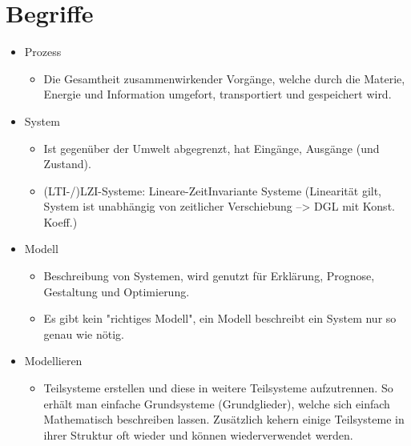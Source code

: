 \documentclass[margin=normal]{tex/hsrzf}
\begin{document}
\section{Begriffe}
\begin{itemize}
      \item Prozess
            \begin{itemize}
                  \item Die Gesamtheit zusammenwirkender Vorgänge, welche durch
                        die Materie, Energie und Information
                        umgefort, transportiert und gespeichert wird.
            \end{itemize}

      \item System
            \begin{itemize}
                  \item Ist gegenüber der Umwelt abgegrenzt, hat Eingänge,
                        Ausgänge (und Zustand).
                  \item (LTI-/)LZI-Systeme: Lineare-ZeitInvariante Systeme
                        (Linearität gilt, System ist unabhängig von zeitlicher Verschiebung
                        --> DGL mit Konst. Koeff.)
            \end{itemize}

      \item Modell
            \begin{itemize}
                  \item Beschreibung von Systemen, wird genutzt für
                        Erklärung, Prognose, Gestaltung und Optimierung.
                  \item Es gibt kein "richtiges Modell",
                        ein Modell beschreibt ein System nur so genau wie nötig.
            \end{itemize}
      \item Modellieren
            \begin{itemize}
                  \item Teilsysteme erstellen und diese
                        in weitere Teilsysteme aufzutrennen.
                        So erhält man einfache Grundsysteme (Grundglieder),
                        welche sich einfach Mathematisch beschreiben lassen.
                        Zusätzlich kehern einige Teilsysteme in ihrer
                        Struktur oft wieder und können wiederverwendet werden.


\end{itemize}
\end{itemize}
\end{document}
